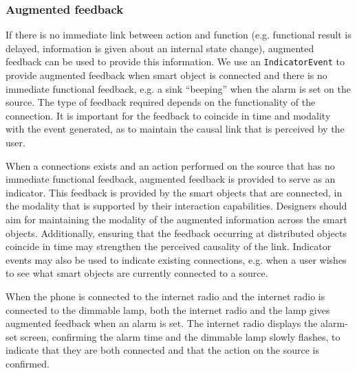 \subsubsection{Augmented feedback} 
If there is no immediate link between action and function  (e.g. functional result is delayed, information is given about an internal state change), augmented feedback can be used to provide this information. We use an \texttt{IndicatorEvent} to provide augmented feedback when smart object is connected and there is no immediate functional feedback, e.g. a sink ``beeping'' when the alarm is set on the source.  The type of feedback required depends on the functionality of the connection. It is important for the feedback to coincide in time and modality with the event generated, as to maintain the causal link that is perceived by the user.

When a connections exists and an action performed on the source that has no immediate functional feedback, augmented feedback is provided to serve as an indicator. This feedback is  provided by the smart objects that are connected, in the modality that is supported by their interaction capabilities. Designers should aim for maintaining the modality of the augmented information across the smart objects. Additionally, ensuring that the feedback occurring at distributed objects coincide in time may strengthen the perceived causality of the link. Indicator events may also be used to indicate existing connections, e.g. when a user wishes to see what smart objects are currently connected to a source.  

\begin{example}
When the phone is connected to the internet radio and the internet radio is connected to the dimmable lamp, both the internet radio and the lamp gives augmented feedback when an alarm is set. The internet radio displays the alarm-set screen, confirming the alarm time and the dimmable lamp slowly flashes, to indicate that they are both connected and that the action on the source is confirmed.
\end{example}




